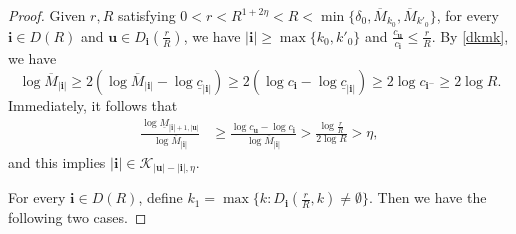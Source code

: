 \documentclass[12pt]{amsart}
\numberwithin{equation}{section}
\theoremstyle{plain}
\theoremstyle{remark}
\theoremstyle{definition}
\newcommand{\kk}{\mathcal{K}}
\newcommand{\om}{\overline{M}}
\newcommand{\um}{\underline{M}}
\newcommand{\iii}{\mathbf{i}}
\newcommand{\bu}{\mathbf{u}}
\newcommand{\de}{\delta}
\newcommand{\f}{\frac}
\newcommand{\uc}{\underline{c}}
\renewcommand{\ge}{\geqslant}
\renewcommand{\geq}{\geqslant}
\renewcommand{\leq}{\leqslant}
\begin{document}
\begin{proof}
		
		Given $r,R$ satisfying $0<r<R^{1+2\eta}<R<\min \{ \de_0,\om_{k_0},\om_{k'_0}\}$,  for every $\iii\in D(R)$  and $\bu\in D_\iii\left(\f rR\right)$, we have $|\iii|\ge \max\{k_0,k'_0\}$ and $\frac{c_\bu}{c_\iii}\leq \frac{r}{R}$. By \eqref{dkmk}, we have
		$$
		\log \om_{|\iii|}\geq 2(\log \om_{|\iii|}-\log\uc_{|\iii|})\geq 2(\log c_{\iii}-\log\uc_{|\iii|}) \geq 2\log c_{\iii^-} \geq 2\log R.
		$$
		Immediately, it follows that 
		\begin{align*}
			\f{\log \um_{|\iii|+1,|\bu|}}{\log \om_{|\iii|}}
			&\ge \f{\log{c_\bu}-\log{c_\iii}}{\log \om_{|\iii|}} >\f{\log\f{r}R}{2\log R} >\eta, 
		\end{align*}
		and this implies  $|\iii|\in \kk_{|\bu|-|\iii|,\eta}$.
		
		
		For every $\iii\in D(R)$, define $k_1=\max\big\{k:D_\iii(\f rR,k)\neq\emptyset\big\} $. Then we have the following two cases.
		

\end{proof}
\end{document}
